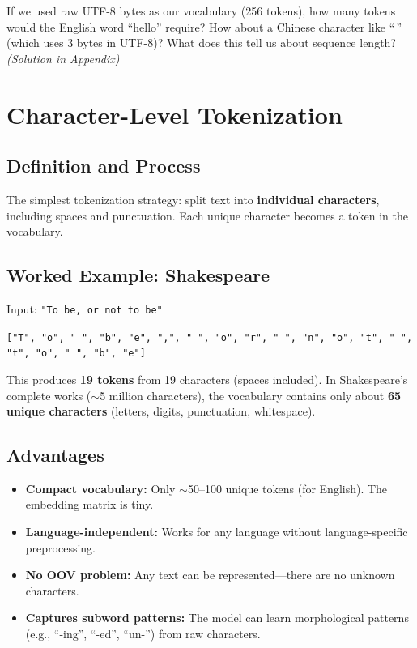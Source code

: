 \documentclass[11pt,a4paper]{article}
\begin{document}
\begin{tcolorbox}[questionbox={Self-Check Q3}]
If we used raw UTF-8 bytes as our vocabulary (256 tokens), how many tokens would the English word ``hello'' require? How about a Chinese character like ``\,'' (which uses 3 bytes in UTF-8)? What does this tell us about sequence length? \textit{(Solution in Appendix)}
\end{tcolorbox}

\section{Character-Level Tokenization}

\subsection{Definition and Process}

The simplest tokenization strategy: split text into \textbf{individual characters}, including spaces and punctuation. Each unique character becomes a token in the vocabulary.

\subsection{Worked Example: Shakespeare}

Input: \texttt{"To be, or not to be"}

\begin{center}
\texttt{["T", "o", " ", "b", "e", ",", " ", "o", "r", " ", "n", "o", "t", " ", "t", "o", " ", "b", "e"]}
\end{center}

This produces \textbf{19 tokens} from 19 characters (spaces included). In Shakespeare's complete works ($\sim$5 million characters), the vocabulary contains only about \textbf{65 unique characters} (letters, digits, punctuation, whitespace).

\subsection{Advantages}

\begin{itemize}[leftmargin=1.5em]
    \item \textbf{Compact vocabulary:} Only $\sim$50--100 unique tokens (for English). The embedding matrix is tiny.
    \item \textbf{Language-independent:} Works for any language without language-specific preprocessing.
    \item \textbf{No OOV problem:} Any text can be represented---there are no unknown characters.
    \item \textbf{Captures subword patterns:} The model can learn morphological patterns (e.g., ``-ing'', ``-ed'', ``un-'') from raw characters.
\end{itemize}
\end{document}
